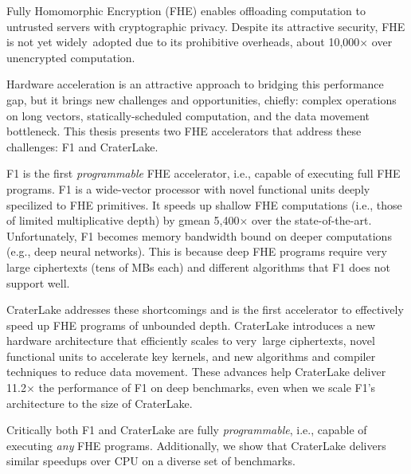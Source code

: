 Fully Homomorphic Encryption (FHE) enables offloading computation to untrusted
servers with cryptographic privacy. Despite its attractive security, FHE is not
yet widely~adopted due to its prohibitive overheads, about 10,000$\times$ over
unencrypted computation.

Hardware acceleration is an attractive approach to bridging this performance
gap, but it brings new challenges and opportunities, chiefly: complex
operations on long vectors, statically-scheduled computation, and the data
movement bottleneck. This thesis presents two FHE accelerators that address
these challenges: F1 and CraterLake.

F1 is the first \emph{programmable} FHE accelerator, i.e., capable of executing
full FHE programs. F1 is a wide-vector processor with novel functional units
deeply specilized to FHE primitives. It speeds up shallow FHE computations
(i.e., those of limited multiplicative depth) by gmean 5,400$\times$ over the
state-of-the-art. Unfortunately, F1 becomes memory bandwidth bound on deeper
computations (e.g., deep neural networks). This is because deep FHE programs
require very large ciphertexts (tens of MBs each) and different algorithms that
F1 does not support well.

CraterLake addresses these shortcomings and is the first accelerator to
effectively speed up FHE programs of unbounded depth.  CraterLake introduces a
new hardware architecture that efficiently scales to very~large ciphertexts,
novel functional units to accelerate key kernels, and new algorithms and
compiler techniques to reduce data movement. These advances help CraterLake
deliver 11.2$\times$ the performance of F1 on deep benchmarks, even when we
scale F1's architecture to the size of CraterLake.

Critically both F1 and CraterLake are fully \emph{programmable}, i.e., capable
of executing \emph{any} FHE programs. Additionally, we show that CraterLake
delivers similar speedups over CPU on a diverse set of benchmarks.
